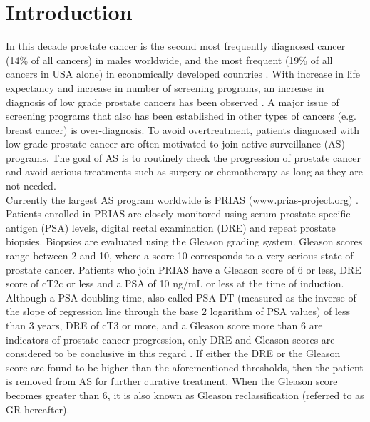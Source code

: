 
\section{Introduction}
\label{sec : introduction}
In this decade prostate cancer is the second most frequently diagnosed cancer (14\% of all cancers) in males worldwide, and the most frequent (19\% of all cancers in USA alone) in economically developed countries \citep{GlobalCancerStats2012,USACancerStats2017}. With increase in life expectancy and increase in number of screening programs, an increase in diagnosis of low grade prostate cancers has been observed \citep{potoskyPSAcancer}. A major issue of screening programs that also has been established in other types of cancers (e.g. breast cancer) is over-diagnosis. To avoid overtreatment, patients diagnosed with low grade prostate cancer are often motivated to join active surveillance (AS) programs. The goal of AS is to routinely check the progression of prostate cancer and avoid serious treatments such as surgery or chemotherapy as long as they are not needed.\\

Currently the largest AS program worldwide is PRIAS (\url{www.prias-project.org}) \citep{bokhorst2015compliance}. Patients enrolled in PRIAS are closely monitored using serum prostate-specific antigen (PSA) levels, digital rectal examination (DRE) and repeat prostate biopsies. Biopsies are evaluated using the Gleason grading system. Gleason scores range between 2 and 10, where a score 10 corresponds to a very serious state of prostate cancer. Patients who join PRIAS have a Gleason score of 6 or less, DRE score of cT2c or less and a PSA of 10 ng/mL or less at the time of induction. Although a PSA doubling time, also called PSA-DT (measured as the inverse of the slope of regression line through the base 2 logarithm of PSA values) of less than 3 years, DRE of cT3 or more, and a Gleason score more than 6 are indicators of prostate cancer progression, only DRE and Gleason scores are considered to be conclusive in this regard \citep{bokhorst2016decade}. If either the DRE or the Gleason score are found to be higher than the aforementioned thresholds, then the patient is removed from AS for further curative treatment. When the Gleason score becomes greater than 6, it is also known as Gleason reclassification (referred to as GR hereafter).\\

